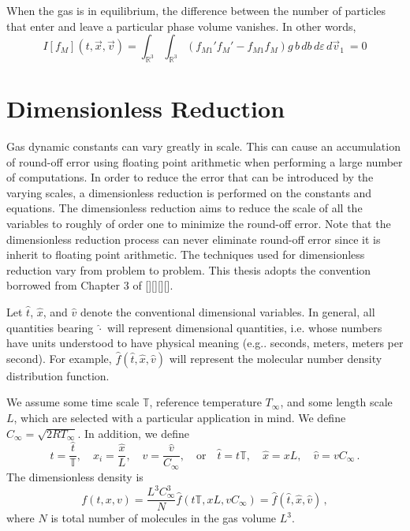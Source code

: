 \documentclass[12pt]{CSUNthesis}
\def\T{\mathbb{T}}
\def\R{\mathbb{R}}
\newcommand{\Tref}{T_{\infty}}
\newcommand{\Cref}{C_{\infty}}
\def\T{\mathbb{T}}
\def\R{\mathbb{R}}
\newcommand{\vecx}{\vec{x}}
\newcommand{\vecv}{\vec{v}}
\begin{document}
When the gas is in equilibrium, the difference between the number of particles that enter and leave a particular phase volume vanishes. In other words, 
\begin{equation*}
I[f_M](t,\vecx,\vecv) = \int_{\R^3} \int_{\R^3} (f_{M1}'f_M' - f_{M1} f_M)  g\, b\, db\, d\varepsilon\, d\vecv_1\ = 0
\end{equation*}

\section{Dimensionless Reduction}

Gas dynamic constants can vary greatly in scale. This can cause an accumulation of round-off error using floating point arithmetic when performing a large number of computations. In order to reduce the error that can be introduced by the varying scales, a dimensionless reduction is performed on the constants and equations. The dimensionless reduction aims to reduce the scale of all the variables to roughly of order one to minimize the round-off error. Note that the dimensionless reduction process can never eliminate round-off error since it is inherit to floating point arithmetic. The techniques used for dimensionless reduction vary from problem to problem. This thesis adopts the convention borrowed from Chapter 3 of [][][][].

Let $\hat{t}$, $\hat{x}$, and $\hat{v}$ denote the conventional dimensional variables. In general, all quantities bearing $\hat{\cdot}$ will represent dimensional quantities, i.e. whose numbers have units understood to have physical meaning (e.g.. seconds, meters, meters per second). For example, $\hat{f}(\hat{t},\hat{x},\hat{v})$ will represent the molecular number density distribution function.

We assume some time scale $\mathbb{T}$, reference temperature $\Tref$, and some length scale $L$, which are selected with a particular application in mind. We define $\Cref = \sqrt{2R\Tref}$. In addition, we define
\begin{equation}
\label{eq:new_dimless}
t=\frac{\hat{t}}{\T},
\quad x_{i}=\frac{\hat{x}}{L},
\quad v=\frac{\hat{v}}{C_{\infty}}, 
\quad \mbox{or}
\quad \hat{t}=t\T,
\quad \hat{x}=x L,
\quad \hat{v}=vC_{\infty}\, .
\end{equation}
The dimensionless density is
\begin{equation}
f(t,x,v) = \frac{L^3 \Cref^3}{N} \hat{f}(t\mathbb{T},xL, v\Cref) = \hat{f}(\hat{t},\hat{x},\hat{v})\, ,
\end{equation}
where $N$ is total number of molecules in the gas volume $L^3$. 
\end{document}
